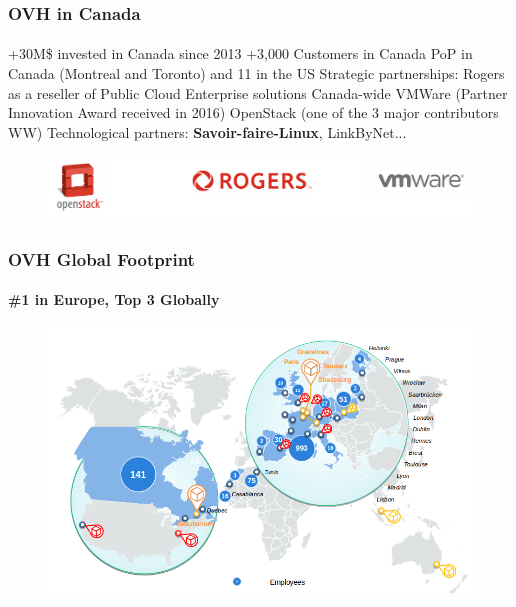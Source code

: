 	\begin{frame}
	\frametitle{OVH in Canada}
	\framesubtitle{}
		\begin{outline}
			\1 +30M\$ invested in Canada since 2013 
			\1 +3,000 Customers in Canada
			 PoP in Canada (Montreal and Toronto) and 11 in the US
			\1 Strategic partnerships:
				\2 Rogers as a reseller of Public Cloud Enterprise solutions Canada-wide 
				\2 VMWare (Partner Innovation Award received in 2016)
				\2 OpenStack (one of the 3 major contributors WW)
			\1 Technological partners: \textbf{Savoir-faire-Linux}, LinkByNet...%
		\end{outline}
	        \begin{figure}[h]
                \centering
                \includegraphics[width=.8\textwidth]{../pics/OpenStack-Rogers-VMWare}
        	\end{figure}
	\end{frame}

	\begin{frame}
	\frametitle{OVH Global Footprint}
	\framesubtitle{\#1 in Europe, Top 3 Globally}
	        \begin{figure}[h]
                \centering
                \includegraphics[width=.8\textwidth]{../pics/OVH-global_presence}
        	\end{figure}
	\end{frame}

